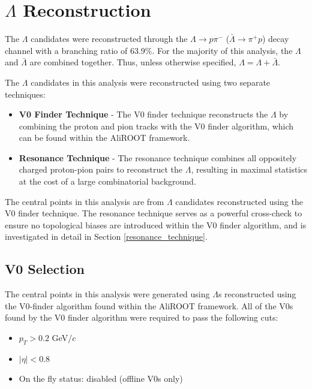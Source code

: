 \documentclass[ALICE,manyauthors]{ALICE_analysis_notes}
\begin{document}
\clearpage

\section{$\Lambda$ Reconstruction}
\label{lambda_reconstruction}

The $\Lambda$ candidates were reconstructed through the $\Lambda \rightarrow p\pi^{-}$ ($\bar{\Lambda} \rightarrow \pi^{+}p$) decay channel with a branching ratio of 63.9\%. For the majority of this analysis, the $\Lambda$ and $\bar{\Lambda}$ are combined together. Thus, unless otherwise specified, $\Lambda = \Lambda + \bar{\Lambda}$. 

The $\Lambda$ candidates in this analysis were reconstructed using two separate techniques:
\begin{itemize}
	\item \textbf{V0 Finder Technique} - The V0 finder technique reconstructs the $\Lambda$ by combining the proton and pion tracks with the V0 finder algorithm, which can be found within the AliROOT framework.
	\item \textbf{Resonance Technique} - The resonance technique combines all oppositely charged proton-pion pairs to reconstruct the $\Lambda$, resulting in maximal statistics at the cost of a large combinatorial background.
\end{itemize}

The central points in this analysis are from $\Lambda$ candidates reconstructed using the V0 finder technique. The resonance technique serves as a powerful cross-check to ensure no topological biases are introduced within the V0 finder algorithm, and is investigated in detail in Section \ref{resonance_technique}.

\subsection{V0 Selection}
\label{v0_selection}
The central points in this analysis were generated using $\Lambda$s reconstructed using the V0-finder algorithm found within the AliROOT framework. All of the V0s found by the V0 finder algorithm were required to pass the following cuts:

\begin{itemize}
	\item $p_{T} > 0.2$ GeV/$c$
	\item $|\eta| < 0.8$
	\item On the fly status: disabled (offline V0s only)
\end{itemize}
\end{document}

